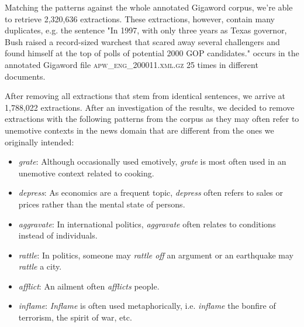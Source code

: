 Matching the patterns against the whole annotated Gigaword corpus, we're able to retrieve 2,320,636 extractions. These extractions, however, contain many duplicates, e.g. the sentence "In 1997, with only three years as Texas governor, Bush raised a record-sized warchest that scared away several challengers and found himself at the top of polls of potential 2000 GOP candidates." occurs in the annotated Gigaword file \textsc{apw\_eng\_200011.xml.gz} 25 times in different documents.

After removing all extractions that stem from identical sentences, we arrive at 1,788,022 extractions. After an investigation of the results, we decided to remove extractions with the following patterns from the corpus as they may often refer to unemotive contexts in the news domain that are different from the ones we originally intended:

\begin{itemize}
	\item \textit{grate}: Although occasionally used emotively, \textit{grate} is most often used in an unemotive context related to cooking.
	\item \textit{depress}: As economics are a frequent topic, \textit{depress} often refers to sales or prices rather than the mental state of persons.
	\item \textit{aggravate}: In international politics, \textit{aggravate} often relates to conditions instead of individuals.
	\item \textit{rattle}: In politics, someone may \textit{rattle off} an argument or an earthquake may \textit{rattle} a city.
	\item \textit{afflict}: An ailment often \textit{afflicts} people.
	\item \textit{inflame}: \textit{Inflame} is often used metaphorically, i.e. \textit{inflame} the bonfire of terrorism, the spirit of war, etc.
\end{itemize}

